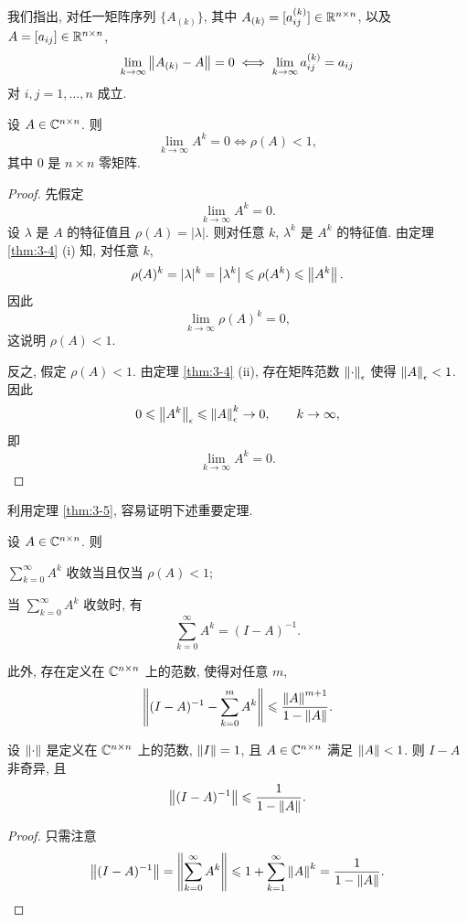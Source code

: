 我们指出, 对任一矩阵序列 $\{A_{(k)}\}$, 其中 $A_{(k)}=[a_{ij}^{(k)}]\in\mathbb{R}^{n\times n}$, 以及 $A=[a_{ij}]\in\mathbb{R}^{n\times n}$,
\[
  \lim_{k\to\infty}\left\|A_{(k)}-A\right\|=0
  \iff
  \lim_{k\to\infty}a_{ij}^{(k)}=a_{ij}
\]
对 $i,j=1,\ldots,n$ 成立.

\begin{theorem}
\label{thm:3-5}
设 $A\in\mathbb{C}^{n\times n}$. 则
\[
  \lim_{k\to\infty}A^k=0\iff\rho(A)<1,
\]
其中 $0$ 是 $n\times n$ 零矩阵.
\end{theorem}

\begin{proof}
先假定
\[
  \lim_{k\to\infty}A^k=0.
\]
设 $\lambda$ 是 $A$ 的特征值且 $\rho(A)=|\lambda|$. 则对任意 $k$, $\lambda^k$ 是 $A^k$ 的特征值. 由定理 \ref{thm:3-4} (i) 知, 对任意 $k$,
\[
  \rho(A)^k=|\lambda|^k=\left|\lambda^k\right|\leqslant\rho(A^k)\leqslant\left\|A^k\right\|.
\]
因此
\[
  \lim_{k\to\infty}\rho(A)^k=0,
\]
这说明 $\rho(A)<1$.

反之, 假定 $\rho(A)<1$. 由定理 \ref{thm:3-4} (ii), 存在矩阵范数 $\left\|\cdot\right\|_\epsilon$ 使得 $\left\|A\right\|_\epsilon<1$. 因此
\[
  0\leqslant\left\|A^k\right\|_\epsilon\leqslant\left\|A\right\|_\epsilon^k\to0,
  \qquad k\to\infty,
\]
即
\[
  \lim_{k\to\infty}A^k=0.
\]
\end{proof}

利用定理 \ref{thm:3-5}, 容易证明下述重要定理.

\begin{theorem}
\label{thm:3-6}
设 $A\in\mathbb{C}^{n\times n}$. 则
\begin{romanlist}
  \item $\sum_{k=0}^{\infty}A^k$ 收敛当且仅当 $\rho(A)<1$;
  \item 当 $\sum_{k=0}^{\infty}A^k$ 收敛时, 有
  \[
    \sum_{k=0}^{\infty}A^k=(I-A)^{-1}.
  \]
\end{romanlist}
此外, 存在定义在 $\mathbb{C}^{n\times n}$ 上的范数, 使得对任意 $m$,
\[
  \left\|(I-A)^{-1}-\sum_{k=0}^{m}A^k\right\|\leqslant\frac{\left\|A\right\|^{m+1}}{1-\left\|A\right\|}.
\]
\end{theorem}

\begin{corollary}
\label{cor:3-1}
设 $\left\|\cdot\right\|$ 是定义在 $\mathbb{C}^{n\times n}$ 上的范数, $\left\|I\right\|=1$, 且 $A\in\mathbb{C}^{n\times n}$ 满足 $\left\|A\right\|<1$. 则 $I-A$ 非奇异, 且
\[
  \left\|(I-A)^{-1}\right\|\leqslant\frac{1}{1-\left\|A\right\|}.
\]
\end{corollary}

\begin{proof}
只需注意
\[
  \left\|(I-A)^{-1}\right\|=\left\|\sum_{k=0}^{\infty}A^k\right\|
  \leqslant1+\sum_{k=1}^{\infty}\left\|A\right\|^k=\frac{1}{1-\left\|A\right\|}.
\]
\end{proof}

